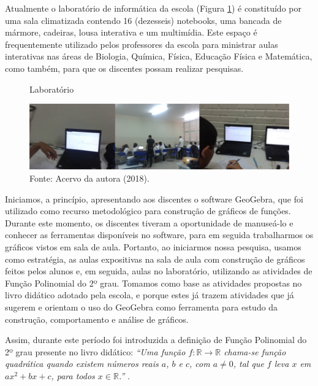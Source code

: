 \begin{refsection}
    Atualmente o laboratório de informática da escola (Figura \ref{fig:lab-ee-edgar-b}) é constituído por uma sala climatizada contendo 16 (dezesseis) notebooks, uma bancada de mármore, cadeiras, lousa interativa e um multimídia. Este espaço é frequentemente utilizado pelos professores da escola para ministrar aulas interativas nas áreas de Biologia, Química, Física, Educação Física e Matemática, como também, para que os discentes possam realizar pesquisas.

    \begin{figure}[ht]%
        \centering%
        \caption{Laboratório}%
        \includegraphics[width=.90\textwidth]{articles/03-contribuicoes-do-sof/image3.png}%
        \caption*{Fonte: Acervo da autora (2018).}%
        \label{fig:lab-ee-edgar-b}%
    \end{figure}%

    Iniciamos, a princípio, apresentando aos discentes o software GeoGebra, que foi utilizado como recurso metodológico para construção de gráficos de funções. Durante este momento, os discentes tiveram a oportunidade de manuseá-lo e conhecer as ferramentas disponíveis no software, para em seguida trabalharmos os gráficos vistos em sala de aula. Portanto, ao iniciarmos nossa pesquisa, usamos como estratégia, as aulas expositivas na sala de aula com construção de gráficos feitos pelos alunos e, em seguida, aulas no laboratório, utilizando as atividades de Função Polinomial do 2º grau. Tomamos como base as atividades propostas no livro didático adotado pela escola, \textcite{DANTE2016Matemática} e \textcite{BALESTRI2016Matemática} porque estes já trazem atividades que já sugerem e orientam o uso do GeoGebra como ferramenta para estudo da construção, comportamento e análise de gráficos. 

    Assim, durante este período foi introduzida a definição de Função Polinomial do 2º grau presente no livro didático: \textit{``Uma função $f: \mathbb{R} \rightarrow \mathbb{R}$ chama-se função quadrática quando existem números reais $a$, $b$ e $c$, com $a \neq 0$, tal que $f$ leva $x$ em {\boldmath$ax^2 + bx + c$}, para todos $x \in \mathbb{R}$.''} \cite[p.~102]{DANTE2016Matemática}.  


\end{refsection}
